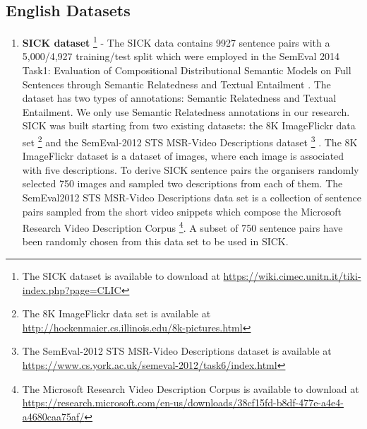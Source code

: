 \subsection{English Datasets}
\begin{enumerate}
  \item \textbf{SICK dataset} \footnote{The SICK dataset is available to download at \url{https://wiki.cimec.unitn.it/tiki-index.php?page=CLIC}} - The SICK data contains 9927 sentence pairs with a 5,000/4,927 training/test split which were employed in the SemEval 2014 Task1: Evaluation of Compositional Distributional Semantic Models on Full Sentences through Semantic Relatedness and Textual Entailment \cite{marelli-etal-2014-semeval}. The dataset has two types of annotations: Semantic Relatedness and Textual Entailment. We only use Semantic Relatedness annotations in our research. SICK was built starting from two existing datasets: the 8K ImageFlickr data set \footnote{The 8K ImageFlickr data set is available at \url{http://hockenmaier.cs.illinois.edu/8k-pictures.html}} \cite{rashtchian-etal-2010-collecting} and the SemEval-2012 STS MSR-Video Descriptions dataset \footnote{The SemEval-2012 STS MSR-Video Descriptions dataset is available at \url{https://www.cs.york.ac.uk/semeval-2012/task6/index.html}} \cite{agirre-etal-2012-semeval}. The 8K ImageFlickr dataset is a dataset of images, where each image is associated with five descriptions. To derive SICK sentence pairs the organisers randomly selected 750 images and sampled two descriptions from each of them. The SemEval2012 STS MSR-Video Descriptions data set is a collection of sentence pairs sampled from the short video snippets which compose the Microsoft Research Video Description Corpus \footnote{The Microsoft Research Video Description Corpus is available to download at \url{https://research.microsoft.com/en-us/downloads/38cf15fd-b8df-477e-a4e4-a4680caa75af/}}. A subset of 750 sentence pairs have been randomly chosen from this data set to be used in SICK. 
  

\end{enumerate}
